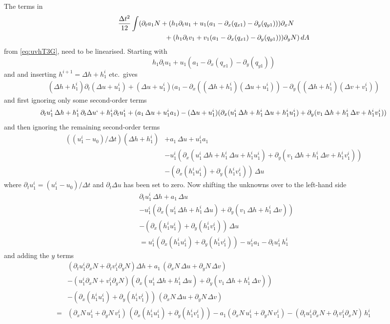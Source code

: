 \documentclass[10pt,a4paper]{book}
\newcommand{\p}{\partial}
\begin{document}
The terms in
\begin{align}
& \frac{\Delta t^2}{12} \int (  \p_t a_1 N + ( h_1 \p_t u_1 + u_1 (a_1-\p_x (q_{x1})-\p_y (q_{y1}))) \p_x N \nonumber \\
&  \hspace{2.4cm}  + ( h_1 \p_t v_1 + v_1 (a_1-\p_x (q_{x1})-\p_y (q_{y1})))\p_y N )\, dA \nonumber \\
\end{align}
from \eqref{eq:uvhT3G}, need to be linearised. Starting with
\[
   h_1 \p_t u_1 + u_1 (a_1-\p_x (q_{x1})-\p_y (q_{y1})) 
\]
and and inserting $h^{i+1}=\Delta h + h^i_1$ etc.\ gives
\begin{align*}
 (\Delta h + h^i_1) \p_t(\Delta u + u^i_1) 
+(\Delta u + u^i_1) (a_1-\p_x ((\Delta h + h^i_1)(\Delta u + u^i_1))-\p_y ((\Delta h + h^i_1) (\Delta v + v^i_1))
\end{align*}
and first ignoring only some second-order terms 
\begin{align*}
 \p_t u^i_1\,  \Delta h + h^i_1 \, \p_t \Delta u `+ h^i_1 \p_t u^i_1
+(a_1 \, \Delta u  + u^i_1 a_1 ) 
- (\Delta u + u^i_1)  (\p_x (u^i_1 \, \Delta h + h^i_1\,\Delta u + h^i_1 u^i_1)+\p_y (v_1 \, \Delta h + h^i_1 \, \Delta v+h^i_1 v^i_1))
\end{align*}
and then ignoring the remaining second-order terms
\begin{align*}
 ((u^i_1-u_0)/\Delta t) (\Delta h + h^i_1) 
&+a_1 \, \Delta u  + u^i_1 a_1 \\
&- u^i_1  (\p_x (u^i_1 \, \Delta h + h^i_1\,\Delta u + h^i_1 u^i_1)+\p_y (v_1 \, \Delta h + h^i_1 \, \Delta v+h^i_1 v^i_1)) \\
&- ( \p_x (h^i_1 u^i_1) +\p_y (h^i_1 v^i_1)) \, \Delta u
\end{align*}
where $\p_t u^i_1=(u^i_1-u_0)/\Delta t$ and $\p_t \Delta u$ has been set to zero. Now shifting the unknowns over to the left-hand side
\begin{align*}
& \p_t u^i_1 \, \Delta h + a_1 \, \Delta u \\
&- u^i_1  (\p_x (u^i_1 \, \Delta h + h^i_1\,\Delta u ) +\p_y (v_1 \, \Delta h + h^i_1 \, \Delta v)) \\
&- ( \p_x (h^i_1 u^i_1) +\p_y (h^i_1 v^i_1)) \, \Delta u \\
&=  u^i_1  (\p_x( h^i_1 u^i_1)+\p_y (h^i_1 v^i_1)) - u^i_1 a_1 -\p_t u^i_1 \,h^i_1 
\end{align*}
and adding the $y$ terms
\begin{align*}
& (\p_t u^i_1 \p_x N +\p_t v^i_1 \p_y N ) \Delta h  + a_1 \, (\p_x N \, \Delta u  + \p_y N \, \Delta v) \\
&- (u^i_1 \p_x N +v^i_1 \p_y N )  (\p_x (u^i_1 \, \Delta h + h^i_1\,\Delta u ) +\p_y (v_1 \, \Delta h + h^i_1 \, \Delta v)) \\
&- ( \p_x (h^i_1 u^i_1) +\p_y (h^i_1 v^i_1)) \, (\p_x N \, \Delta u+\p_y N \, \Delta v)\\
=&  (\p_x N \, u^i_1+\p_y N \, v^i_1) \,  (\p_x( h^i_1 u^i_1)+\p_y (h^i_1 v^i_1)) -a_1 (\p_x N \, u^i_1 +\p_y N \, v^i_1) -(\p_t u^i_1 \p_x N + \p_t v^i_1 \p_x N) \,h^i_1 
\end{align*}
\end{document}
